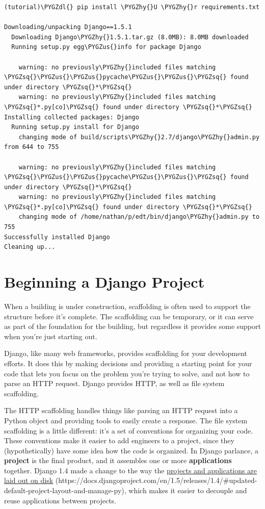 \documentclass[letterpaper,10pt,english]{sphinxmanual}
\def\PYGZus{\char`\_}
\def\PYGZdl{\char`\$}
\def\PYGZhy{\char`\-}
\def\PYGZsq{\char`\'}
\renewcommand\PYGZsq{\textquotesingle}
\begin{document}
\begin{Verbatim}[commandchars=\\\{\}]
(tutorial)\PYGZdl{} pip install \PYGZhy{}U \PYGZhy{}r requirements.txt

Downloading/unpacking Django==1.5.1
  Downloading Django\PYGZhy{}1.5.1.tar.gz (8.0MB): 8.0MB downloaded
  Running setup.py egg\PYGZus{}info for package Django

    warning: no previously\PYGZhy{}included files matching \PYGZsq{}\PYGZus{}\PYGZus{}pycache\PYGZus{}\PYGZus{}\PYGZsq{} found under directory \PYGZsq{}*\PYGZsq{}
    warning: no previously\PYGZhy{}included files matching \PYGZsq{}*.py[co]\PYGZsq{} found under directory \PYGZsq{}*\PYGZsq{}
Installing collected packages: Django
  Running setup.py install for Django
    changing mode of build/scripts\PYGZhy{}2.7/django\PYGZhy{}admin.py from 644 to 755

    warning: no previously\PYGZhy{}included files matching \PYGZsq{}\PYGZus{}\PYGZus{}pycache\PYGZus{}\PYGZus{}\PYGZsq{} found under directory \PYGZsq{}*\PYGZsq{}
    warning: no previously\PYGZhy{}included files matching \PYGZsq{}*.py[co]\PYGZsq{} found under directory \PYGZsq{}*\PYGZsq{}
    changing mode of /home/nathan/p/edt/bin/django\PYGZhy{}admin.py to 755
Successfully installed Django
Cleaning up...
\end{Verbatim}


\section{Beginning a Django Project}
\label{tutorial/getting-started:pip}\label{tutorial/getting-started:beginning-a-django-project}
When a building is under construction, scaffolding is often used to
support the structure before it's complete. The scaffolding can be
temporary, or it can serve as part of the foundation for the
building, but regardless it provides some support when you're just
starting out.

Django, like many web frameworks, provides scaffolding for your
development efforts. It does this by making decisions and providing
a starting point for your code that lets you focus on the problem
you're trying to solve, and not how to parse an HTTP request.
Django provides HTTP, as well as file system scaffolding.

The HTTP scaffolding handles things like parsing an HTTP request
into a Python object and providing tools to easily create a
response. The file system scaffolding is a little different: it's a
set of conventions for organizing your code. These conventions make
it easier to add engineers to a project, since they
(hypothetically) have some idea how the code is organized. In
Django parlance, a \textbf{project} is the final product, and it
assembles one or more \textbf{applications} together. Django 1.4 made a
change to the way the \href{https://docs.djangoproject.com/en/1.5/releases/1.4/\#updated-default-project-layout-and-manage-py}{projects and applications are laid out on
disk} (https://docs.djangoproject.com/en/1.5/releases/1.4/\#updated-default-project-layout-and-manage-py), which makes it easier to decouple and reuse applications
between projects.
\end{document}
